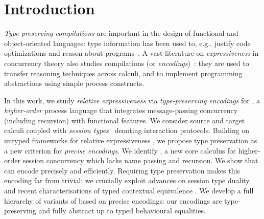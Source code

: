 \documentclass[preprint,11pt]{elsarticle}
\begin{document}

\section{Introduction}
\label{sec:intro}
%


\emph{Type-preserving compilations} are important in the design of
functional and object-oriented languages: type information has been
used to, e.g., justify code optimizations and reason about programs~\cite{DBLP:journals/toplas/MorrisettWCG99,DBLP:conf/pldi/ShaoA95,DBLP:journals/toplas/LeagueST02}.
A vast literature on 
{\em expressiveness} 
in concurrency theory
also studies compilations (or \emph{encodings})~\cite{Palamidessi03,DBLP:journals/iandc/Gorla10,DBLP:journals/tcs/FuL10,DBLP:conf/icalp/LanesePSS10,DBLP:journals/corr/PetersG15}:
they are used to transfer reasoning techniques 
across calculi,
and to 
implement programming abstractions using simple process constructs.

In this work, we study 
{\em relative expressiveness} 
via \emph{type-preserving encodings} for \HOp, a \emph{higher-order} 
process language that integrates message-passing concurrency (including recursion) with functional features.
We consider source and target calculi coupled with \emph{session types}~\cite{honda.vasconcelos.kubo:language-primitives} denoting interaction protocols. 
Building on untyped frameworks for relative expressiveness
\cite{DBLP:journals/iandc/Gorla10}, 
we propose type preservation as a {new criterion} for \emph{precise encodings}.
We identify \HO, a new core calculus for higher-order session concurrency which lacks
name passing and recursion. 
We show that \HO can encode \HOp precisely and efficiently. 
Requiring  
type preservation makes
this encoding far from trivial: we crucially exploit advances on
session type duality~\cite{TGC14,DBLP:journals/corr/abs-1202-2086} and recent
characterisations of typed contextual equivalence \cite{characteristic_bis,KouzapasPY17}.
We develop a full hierarchy of variants of \HOp based on 
precise encodings: %
our encodings are
type-preserving and fully abstract up to typed
behavioural equalities. 
\end{document}
